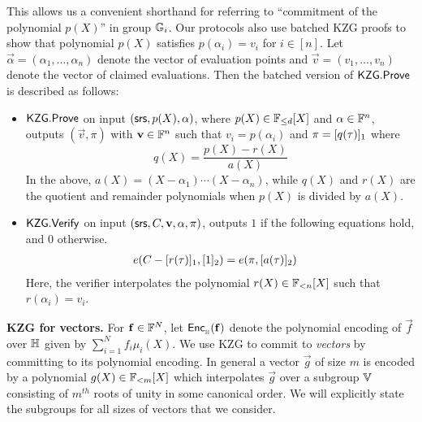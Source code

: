 This allows us a convenient shorthand for referring to ``commitment of the polynomial $p(X)$'' in group $\mathbb{G}_i$.
Our protocols also use batched KZG proofs to show that polynomial $p(X)$ satisfies $p(\alpha_i)=v_i$ for $i\in [n]$. Let
$\vec{\alpha}=(\alpha_1,\ldots,\alpha_n)$
denote the vector of evaluation points and $\vec{v}=(v_1,\ldots,v_n)$ denote the vector of claimed evaluations. Then the batched
version of $\mathsf{KZG.Prove}$ is described as follows:
\begin{itemize}[leftmargin=1em]
	\item $\mathsf{KZG.Prove}$ on input $(\mathsf{srs},p(X),\mathbf{\alpha})$, where $p(X) \in \mathbb{F}_{\leq d}[X]$ and $\mathbf{\alpha}\in\mathbb{F}^n$,
	outputs $(\vec{v}, \pi)$ with $\mathbf{v}\in \mathbb{F}^n$ such that $v_i=p(\alpha_i)$ and $\pi=[q(\tau)]_1$ where
	\[ q(X)=\frac{p(X)-r(X)}{a(X)} \]
	In the above, $a(X)=(X-\alpha_1)\cdots(X-\alpha_n)$, while $q(X)$ and $r(X)$ are the quotient and remainder polynomials when
	 $p(X)$ is divided by $a(X)$.
	\item $\mathsf{KZG.Verify}$ on input $(\mathsf{srs},C,\mathbf{v}, \mathbf{\alpha}, \pi)$, outputs $1$ if the following equations hold, and $0$ otherwise.
	\begin{align*}
		e(C-[r(\tau)]_1, [1]_2) &= e(\pi, [a(\tau)]_2)
	\end{align*}
	Here, the verifier interpolates the polynomial $r(X)\in \mathbb{F}_{<n}[X]$ such that $r(\alpha_i)=v_i$.
\end{itemize}

\noindent\textbf{KZG for vectors.} For $\mathbf{f}\in \mathbb{F}^N$, let $\mathsf{Enc}_{{}_{\mathbb{H}}}(\mathbf{f})$ denote the polynomial encoding of $\vec{f}$ over $\mathbb{H}$ given by $\sum_{i=1}^N f_i\mu_i(X)$.
We use KZG to commit to \emph{vectors} by committing to its polynomial encoding. In general a vector $\vec{g}$ of size $m$ is encoded by a polynomial $g(X)\in \mathbb{F}_{<m}[X]$
which interpolates $\vec{g}$ over a subgroup $\mathbb{V}$ consisting of $m^{th}$ roots of unity in some canonical order. We will explicitly state the subgroups for all sizes
of vectors that we consider.


